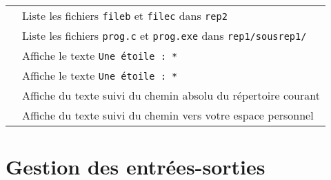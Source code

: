 \documentclass [a4paper]{article}
\begin{document}
\begin{tabular}{ ll }
\hspace{0.5cm}{\verb+ls ../../rep2/file?+}          & Liste les fichiers \verb+fileb+ et \verb+filec+ dans \verb+rep2+ \\
\hspace{0.5cm}{\verb+ls prog.*+}                    & Liste les fichiers \verb+prog.c+ et \verb+prog.exe+ dans \verb+rep1/sousrep1/+ \\
\hspace{0.5cm}{\verb+echo Une étoile : \*+}         & Affiche le texte \og{} \verb+Une étoile : *+ \fg{} \\
\hspace{0.5cm}{\verb+echo "Une étoile : *"+}        & Affiche le texte \og{} \verb+Une étoile : *+ \fg{} \\
\hspace{0.5cm}{\verb+echo "Je suis dans `pwd`"+}    & Affiche du texte suivi du chemin absolu du répertoire courant\\
\hspace{0.5cm}{\verb+echo "J'habite dans $HOME"+}   & Affiche du texte suivi du chemin vers votre espace personnel \\
\hline
\end{tabular}


\section*{Gestion des entrées-sorties}
\end{document}
